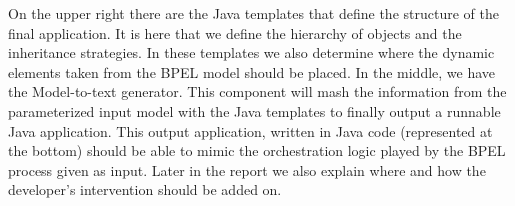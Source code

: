On the upper right there are the Java templates that define the structure of the final application. It is here that we define the hierarchy of objects and the inheritance strategies. In these templates we also determine where the dynamic elements taken from the BPEL model should be placed.  
In the middle, we have the Model-to-text generator. This component will mash the information from the parameterized input model with the Java templates to finally output a runnable Java application. This output application, written in Java code (represented at the bottom) should be able to mimic the orchestration logic played by the BPEL process given as input.  
Later in the report we also explain where and how the developer's intervention should be added on.








